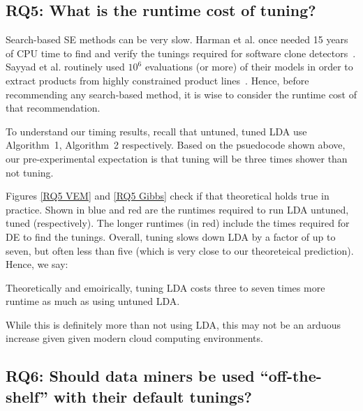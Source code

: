 \documentclass[10pt,conference]{IEEEtran}
\theoremstyle{break}
\begin{document}
\subsection{\textbf{RQ5: What is the runtime cost of tuning?}}

Search-based SE methods can be very slow. Harman et al. once needed 15
years of CPU time to find and verify the tunings required for software
clone detectors~\cite{wang2013searching}. Sayyad et al. routinely used
$10^6$ evaluations (or more) of their models in order to extract
products from highly constrained product
lines~\cite{sayyad2013scalable}. Hence, before recommending any
search-based method, it is wise to consider the runtime cost of that
recommendation.


To understand our timing results, recall that untuned, tuned LDA use
Algorithm~1, Algorithm~2 respectively. Based on the psuedocode
shown above, our pre-experimental expectation is that
tuning will be three times shower than not tuning.


Figures \ref{RQ5 VEM} and \ref{RQ5 Gibbs} check if that theoretical
holds true in practice. Shown in blue and red are the
  runtimes required to run LDA untuned, tuned (respectively).  The
  longer runtimes (in red) include the times required for DE to find
  the tunings. Overall, tuning slows down LDA by a factor of up to
  seven, but often less than five (which is very close to our theoreteical prediction).
  Hence, we say:

  
  \begin{lesson}
    Theoretically and emoirically, tuning LDA costs three to seven times more runtime
    as much as using untuned LDA.
  \end{lesson}

  While this is definitely more than not using LDA, this may not be an arduous increase
  given given modern cloud computing environments.
  

\subsection{\textbf{RQ6: Should data miners be used “off-the-shelf” with their default tunings?}}
\end{document}
